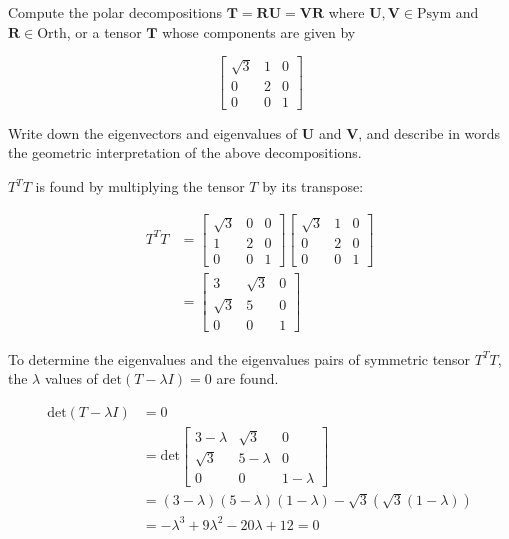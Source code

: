\begin{problem}
\normalfont
Compute the polar decompositions $
    \mathbf{T}=\mathbf{R}\mathbf{U}=\mathbf{V}\mathbf{R}
    $
    where $\mathbf{U},\mathbf{V} \in \text{Psym}$ and $\mathbf{R}\in \text{Orth}$, or a tensor $\mathbf{T}$ whose components are given by
    
    $$
    \begin{bmatrix}
    \sqrt{ 3 } & 1 & 0 \\
    0 & 2 & 0 \\
    0 & 0 & 1
    \end{bmatrix}
    $$
    
    Write down the eigenvectors and eigenvalues of $\mathbf{U}$ and $\mathbf{V}$, and describe in words the geometric interpretation of the above decompositions.
\end{problem}

$T^TT$ is found by multiplying the tensor $T$ by its transpose:


\begin{align*}
T^TT&=\begin{bmatrix}
\sqrt{ 3 } & 0 & 0 \\
1 & 2 & 0 \\
0 & 0 & 1
\end{bmatrix}\begin{bmatrix}
\sqrt{ 3 } & 1 & 0 \\
0 & 2 & 0 \\
0 & 0 & 1
\end{bmatrix}\\[10pt]
&=\begin{bmatrix}
3 & \sqrt{ 3 } & 0 \\
\sqrt{ 3 } & 5 & 0 \\
0 & 0 & 1
\end{bmatrix}
\end{align*}

To determine the eigenvalues and the eigenvalues pairs of symmetric tensor $T^TT$, the $\lambda$ values of $\text{det}(T-\lambda I)=0$ are found.


\begin{align*}
\text{det}(T-\lambda I)&=0\\[10pt]
&=\text{det}\begin{bmatrix}
3-\lambda & \sqrt{ 3 } & 0 \\
\sqrt{ 3 } & 5-\lambda & 0 \\
0 & 0 & 1-\lambda
\end{bmatrix}\\[10pt]
&=(3-\lambda)(5-\lambda)(1-\lambda)-\sqrt{ 3 }(\sqrt{ 3 }(1-\lambda))\\[10pt]
&=-\lambda^3+9\lambda^2-20\lambda+12=0
\end{align*}


